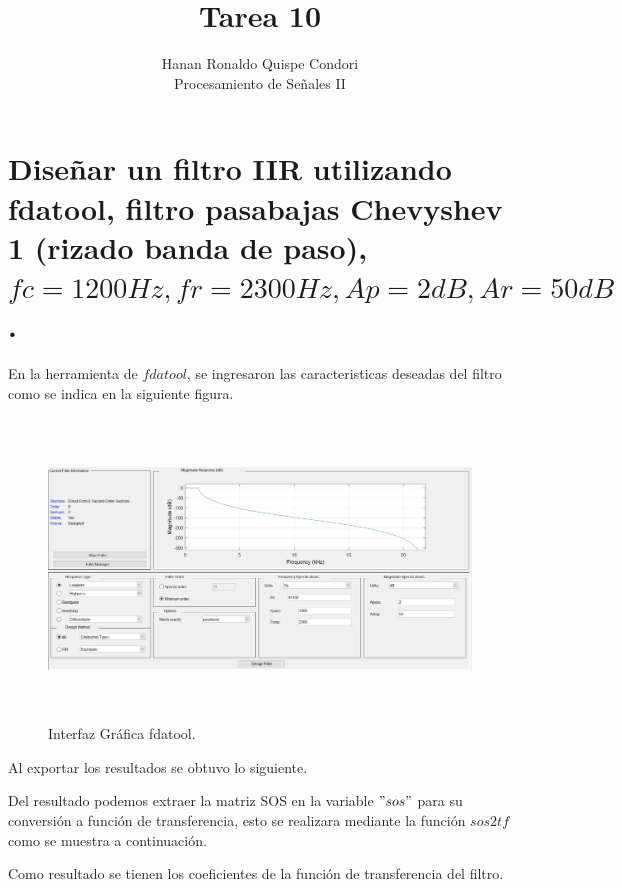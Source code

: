 \documentclass[12pt]{article}
\begin{document}
\title{Tarea 10}
\author{Hanan Ronaldo Quispe Condori\\ %
Procesamiento de Señales II}

\maketitle
\section{Diseñar un filtro IIR utilizando fdatool, filtro pasabajas Chevyshev 1 (rizado banda de paso), $fc=1200Hz,fr=2300Hz,Ap=2dB,Ar=50dB$.}

En la herramienta de $fdatool$, se ingresaron las caracteristicas deseadas del filtro como se indica en la siguiente figura.
\begin{figure}[h]
    \centering
    \includegraphics[width=15cm, height=8cm]{imagenes/fdatool.jpg}
    \caption{Interfaz Gráfica fdatool.}
    \label{fig:fda}
\end{figure}

Al exportar los resultados se obtuvo lo siguiente.


Del resultado podemos extraer la matriz SOS en la variable $"sos"$ para su conversión a función de transferencia, esto se realizara mediante la función $sos2tf$  como se muestra a continuación.



Como resultado se tienen los coeficientes de la función de transferencia del filtro.
\end{document}
